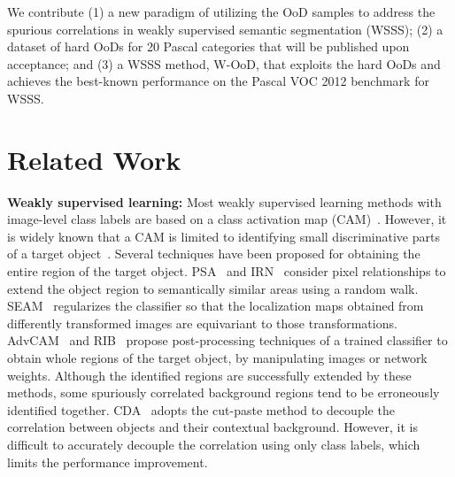 \documentclass[10pt,twocolumn,letterpaper]{article}
\begin{document}
We contribute (1) a new paradigm of utilizing the OoD samples to address the spurious correlations in weakly supervised semantic segmentation (WSSS); (2) a dataset of hard OoDs for 20 Pascal categories that will be published upon acceptance; and (3) a WSSS method, W-OoD, that exploits the hard OoDs and achieves the best-known performance on the Pascal VOC 2012 benchmark for WSSS.



\section{Related Work}

\textbf{Weakly supervised learning:}
Most weakly supervised learning methods with image-level class labels are based on a class activation map (CAM)~\cite{zhou2016learning}. However, it is widely
known that a CAM is limited to identifying small discriminative parts of a target object~\cite{lee2019ficklenet, ahn2019weakly, lee2021reducing}.
Several techniques have been proposed for obtaining the entire region of the target object.
PSA~\cite{ahn2018learning} and IRN~\cite{ahn2019weakly} consider pixel relationships to extend the object region to semantically similar areas using a random walk.
SEAM~\cite{wang2020self} regularizes the classifier so that the localization maps obtained from differently transformed images are equivariant to those transformations.
AdvCAM~\cite{lee2021anti} and RIB~\cite{lee2021reducing} propose post-processing techniques of a trained classifier to obtain whole regions of the target object, by manipulating images or network weights.
Although the identified regions are successfully extended by these methods, some spuriously correlated background regions tend to be erroneously identified together. 
CDA~\cite{su2021context} adopts the cut-paste method to decouple the correlation between objects and their contextual background.
However, it is difficult to accurately decouple the correlation using only class labels, which limits the performance improvement. 
\end{document}
